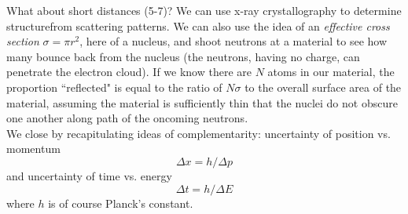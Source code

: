 \documentclass[10pt,letterpaper]{article}
\begin{document}
\indent What about short distances (5-7)? We can use x-ray crystallography to determine structurefrom scattering patterns. We can also use the idea of an \textit{effective cross section} $\sigma = \pi r^2$, here of a nucleus, and shoot neutrons at a material to see how many bounce back from the nucleus (the neutrons, having no charge, can penetrate the electron cloud). If we know there are $N$ atoms in our material, the proportion ``reflected" is equal to the ratio of $N\sigma$ to the overall surface area of the material, assuming the material is sufficiently thin that the nuclei do not obscure one another along path of the oncoming neutrons. \\
\indent We close by recapitulating ideas of complementarity: uncertainty of position vs. momentum
$$ \Delta x = h/\Delta p $$
and uncertainty of time vs. energy
$$ \Delta t = h/\Delta E $$ where $h$ is of course Planck's constant. 
\end{document}
